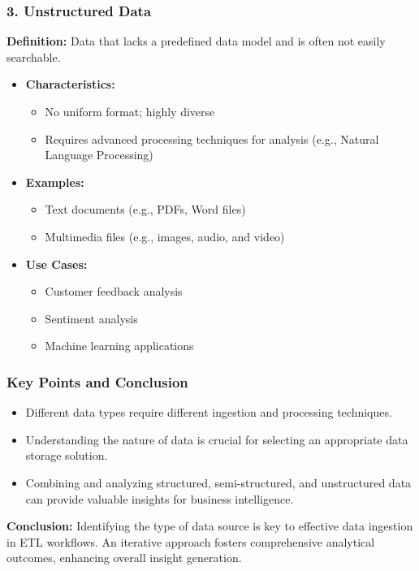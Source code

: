 \documentclass[aspectratio=169]{beamer}
\begin{document}
\begin{frame}[fragile]
  \frametitle{3. Unstructured Data}
  \textbf{Definition:} Data that lacks a predefined data model and is often not easily searchable.

  \begin{itemize}
    \item \textbf{Characteristics:}
      \begin{itemize}
        \item No uniform format; highly diverse
        \item Requires advanced processing techniques for analysis (e.g., Natural Language Processing)
      \end{itemize}
    
    \item \textbf{Examples:}
      \begin{itemize}
        \item Text documents (e.g., PDFs, Word files)
        \item Multimedia files (e.g., images, audio, and video)
      \end{itemize}
    
    \item \textbf{Use Cases:}
      \begin{itemize}
        \item Customer feedback analysis
        \item Sentiment analysis
        \item Machine learning applications
      \end{itemize}
  \end{itemize}
\end{frame}

\begin{frame}[fragile]
  \frametitle{Key Points and Conclusion}
  \begin{itemize}
    \item Different data types require different ingestion and processing techniques.
    \item Understanding the nature of data is crucial for selecting an appropriate data storage solution.
    \item Combining and analyzing structured, semi-structured, and unstructured data can provide valuable insights for business intelligence.
  \end{itemize}

  \textbf{Conclusion:} Identifying the type of data source is key to effective data ingestion in ETL workflows. An iterative approach fosters comprehensive analytical outcomes, enhancing overall insight generation.
\end{frame}
\end{document}

